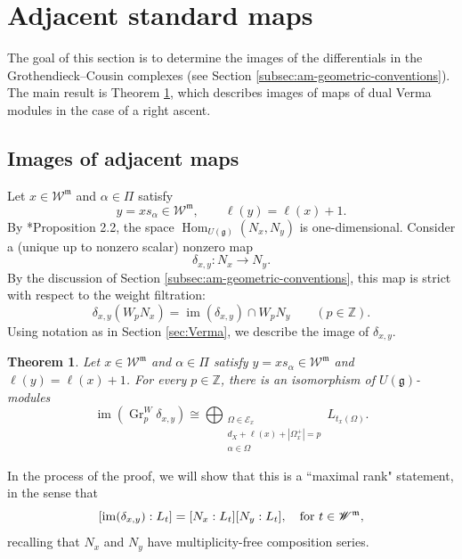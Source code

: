 \documentclass[12pt]{amsart}
\newtheorem{theorem}{Theorem}[section]
\theoremstyle{definition}
\numberwithin{equation}{section}
\newcommand{\g}{\mathfrak g}
\newcommand{\m}{\mathfrak m}
\newcommand{\W}{\mathscr W}
\begin{document}
\section{Adjacent standard maps}\label{sec:adjacent-proof}

The goal of this section is to determine the images of the differentials in the Grothendieck--Cousin complexes (see Section \ref{subsec:am-geometric-conventions}). The main result is Theorem \ref{thm:adjacentmaps}, which describes images of maps of dual Verma modules in the case of a right ascent.

\subsection{Images of adjacent maps}


Let $x\in\W^{\m}$ and $\alpha\in\Pi$ satisfy
\[
y=xs_\alpha\in\W^{\m},
\qquad
\ell(y)=\ell(x)+1.
\]
By \cite{intertwining}*{Proposition 2.2}, the space
$\operatorname{Hom}_{U(\g)}(N_x,N_y)$ is one-dimensional. Consider a (unique up to nonzero scalar) nonzero map
\begin{equation}\label{eq:adjacent-dual-map}
\delta_{x,y}:N_x\longrightarrow N_y.
\end{equation}
By the discussion of Section \ref{subsec:am-geometric-conventions}, this map is strict with respect to the weight filtration:
\[
\delta_{x,y}(W_pN_x)
=
\operatorname{im}(\delta_{x,y})\cap W_pN_y
\qquad(p\in\mathbb Z).
\]
Using notation as in Section \ref{sec:Verma}, we describe the image of $\delta_{x,y}$.

\begin{theorem}\label{thm:adjacentmaps}
Let $x\in\W^{\m}$ and $\alpha\in\Pi$ satisfy $y=xs_\alpha\in\W^{\m}$ and $\ell(y)=\ell(x)+1$. For every $p\in\mathbb Z$, there is an isomorphism of
$U(\g)$-modules
\begin{equation}\label{eq:adjacent-weight-image}
\operatorname{im}\!\left(
  \operatorname{Gr}^{W}_{p}\delta_{x,y}
\right)
\cong
\bigoplus_{\substack{
  \Omega\in\mathscr E_x\\
  d_X+\ell(x)+|\Omega_x^+|=p\\
  \alpha\in\Omega
}}
L_{t_x(\Omega)}.
\end{equation}
\end{theorem}

\noindent In the process of the proof, we will show that this is a ``maximal rank" statement, in the sense that
\begin{equation}\label{eq:maxRank}
[\operatorname{im}(\delta_{x,y}): L_t]=[N_x:L_t][N_y:L_t],\quad \textnormal{for $t\in \W^{\m}$},   
\end{equation}
recalling that $N_x$ and $N_y$ have multiplicity-free composition series.
\end{document}
